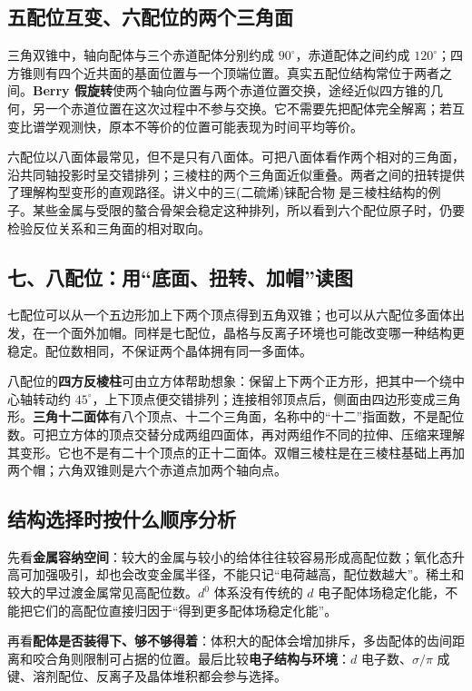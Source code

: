 \subsection{五配位互变、六配位的两个三角面}
三角双锥中，轴向配体与三个赤道配体分别约成 $90^\circ$，赤道配体之间约成 $120^\circ$；四方锥则有四个近共面的基面位置与一个顶端位置。真实五配位结构常位于两者之间。\textbf{Berry 假旋转}使两个轴向位置与两个赤道位置交换，途经近似四方锥的几何，另一个赤道位置在这次过程中不参与交换。它不需要先把配体完全解离；若互变比谱学观测快，原本不等价的位置可能表现为时间平均等价。

六配位以八面体最常见，但不是只有八面体。可把八面体看作两个相对的三角面，沿共同轴投影时呈交错排列；三棱柱的两个三角面近似重叠。两者之间的扭转提供了理解构型变形的直观路径。讲义中的三(二硫烯)铼配合物 \ce{[Re(S2C2(CF3)2)3]} 是三棱柱结构的例子。某些金属与受限的螯合骨架会稳定这种排列，所以看到六个配位原子时，仍要检验反位关系和三角面的相对取向。

\subsection{七、八配位：用“底面、扭转、加帽”读图}
七配位可以从一个五边形加上下两个顶点得到五角双锥；也可以从六配位多面体出发，在一个面外加帽。同样是七配位，晶格与反离子环境也可能改变哪一种结构更稳定。配位数相同，不保证两个晶体拥有同一多面体。

八配位的\textbf{四方反棱柱}可由立方体帮助想象：保留上下两个正方形，把其中一个绕中心轴转动约 $45^\circ$，上下顶点便交错排列；连接相邻顶点后，侧面由四边形变成三角形。\textbf{三角十二面体}有八个顶点、十二个三角面，名称中的“十二”指面数，不是配位数。可把立方体的顶点交替分成两组四面体，再对两组作不同的拉伸、压缩来理解其变形。它也不是有二十个顶点的正十二面体。双帽三棱柱是在三棱柱基础上再加两个帽；六角双锥则是六个赤道点加两个轴向点。

\subsection{结构选择时按什么顺序分析}
先看\textbf{金属容纳空间}：较大的金属与较小的给体往往较容易形成高配位数；氧化态升高可加强吸引，却也会改变金属半径，不能只记“电荷越高，配位数越大”。稀土和较大的早过渡金属常见高配位数。$d^0$ 体系没有传统的 $d$ 电子配体场稳定化能，不能把它们的高配位直接归因于“得到更多配体场稳定化能”。

再看\textbf{配体是否装得下、够不够得着}：体积大的配体会增加排斥，多齿配体的齿间距离和咬合角则限制可占据的位置。最后比较\textbf{电子结构与环境}：$d$ 电子数、$\sigma/\pi$ 成键、溶剂配位、反离子及晶体堆积都会参与选择。

